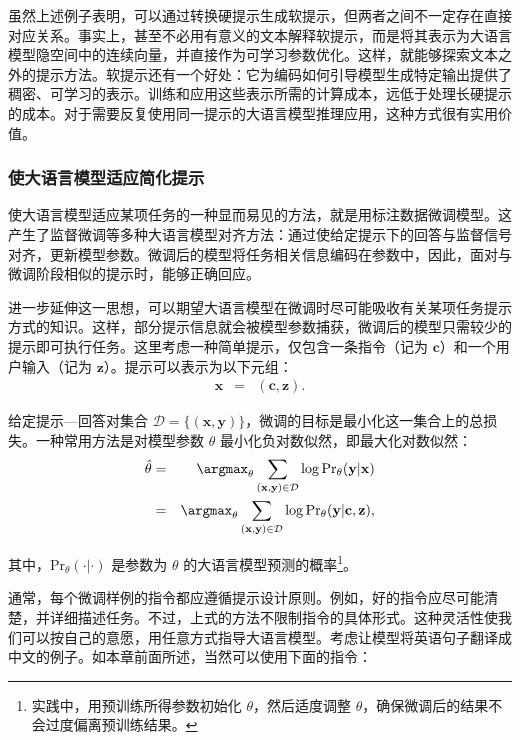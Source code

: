 虽然上述例子表明，可以通过转换硬提示生成软提示，但两者之间不一定存在直接对应关系。事实上，甚至不必用有意义的文本解释软提示，而是将其表示为大语言模型隐空间中的连续向量，并直接作为可学习参数优化。这样，就能够探索文本之外的提示方法。软提示还有一个好处：它为编码如何引导模型生成特定输出提供了稠密、可学习的表示。训练和应用这些表示所需的计算成本，远低于处理长硬提示的成本。对于需要反复使用同一提示的大语言模型推理应用，这种方式很有实用价值。

\subsubsection{使大语言模型适应简化提示}

\noindent 使大语言模型适应某项任务的一种显而易见的方法，就是用标注数据微调模型。这产生了监督微调等多种大语言模型对齐方法：通过使给定提示下的回答与监督信号对齐，更新模型参数。微调后的模型将任务相关信息编码在参数中，因此，面对与微调阶段相似的提示时，能够正确回应。

进一步延伸这一思想，可以期望大语言模型在微调时尽可能吸收有关某项任务提示方式的知识。这样，部分提示信息就会被模型参数捕获，微调后的模型只需较少的提示即可执行任务。这里考虑一种简单提示，仅包含一条指令（记为 $\mathbf{c}$）和一个用户输入（记为 $\mathbf{z}$）。提示可以表示为以下元组：
\begin{eqnarray}
\mathbf{x} & = & (\mathbf{c}, \mathbf{z}).
\end{eqnarray}

给定提示—回答对集合 $\mathcal{D}=\{(\mathbf{x},\mathbf{y})\}$，微调的目标是最小化这一集合上的总损失。一种常用方法是对模型参数 $\theta$ 最小化负对数似然，即最大化对数似然：
\begin{eqnarray}
\hat{\theta} & = & \argmax_{\theta} \sum_{(\mathbf{x},\mathbf{y}) \in \mathcal{D}} \log \mathrm{Pr}_{\theta}(\mathbf{y}|\mathbf{x}) \nonumber \\
             & = & \argmax_{\theta} \sum_{(\mathbf{x},\mathbf{y}) \in \mathcal{D}} \log \mathrm{Pr}_{\theta}(\mathbf{y}|\mathbf{c}, \mathbf{z}),
\end{eqnarray}

\noindent 其中，$\mathrm{Pr}_{\theta}(\cdot|\cdot)$ 是参数为 $\theta$ 的大语言模型预测的概率\footnote{实践中，用预训练所得参数初始化 $\theta$，然后适度调整 $\theta$，确保微调后的结果不会过度偏离预训练结果。}。

通常，每个微调样例的指令都应遵循提示设计原则。例如，好的指令应尽可能清楚，并详细描述任务。不过，上式的方法不限制指令的具体形式。这种灵活性使我们可以按自己的意愿，用任意方式指导大语言模型。考虑让模型将英语句子翻译成中文的例子。如本章前面所述，当然可以使用下面的指令：

